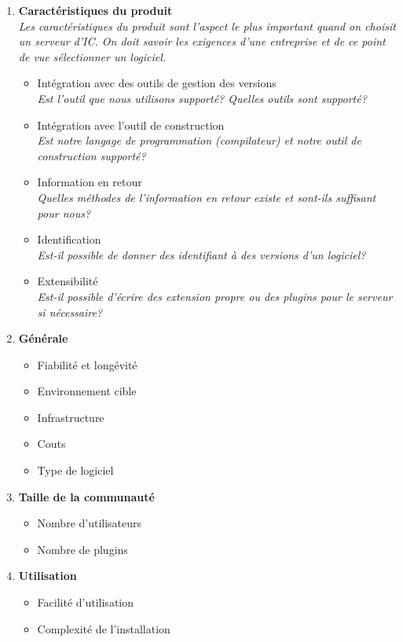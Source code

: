 \begin{enumerate}
\item \textbf{Caractéristiques du produit} \\
\textit{Les caractéristiques du produit sont l'aspect le plus important quand on choisit un serveur d'IC. On doit savoir les exigences d'une entreprise et de ce point de vue sélectionner un logiciel.}
	\begin{itemize}
		\item Intégration avec des outils de gestion des versions \\
		\textit{Est l'outil que nous utilisons supporté? Quelles outils sont supporté?}
		\item Intégration avec l'outil de construction \\
		\textit{Est notre langage de programmation (compilateur) et notre outil de construction supporté?}
		\item Information en retour \\
		\textit{Quelles méthodes de l'information en retour existe et sont-ils suffisant pour nous?}
		\item Identification \\
		\textit{Est-il possible de donner des identifiant à des versions d'un logiciel?}
		\item Extensibilité \\
		\textit{Est-il possible d'écrire des extension propre ou des plugins pour le serveur si nécessaire?}
	\end{itemize}
\item \textbf{Générale}
	\begin{itemize}
		\item Fiabilité et longévité
		\item Environnement cible
		\item Infrastructure
		\item Couts
		\item Type de logiciel
	\end{itemize}
\item \textbf{Taille de la communauté}
	\begin{itemize}
		\item Nombre d'utilisateurs
		\item Nombre de plugins
	\end{itemize}
\item \textbf{Utilisation}
	\begin{itemize}
		\item Facilité d'utilisation
		\item Complexité de l'installation
	\end{itemize}
\end{enumerate}
